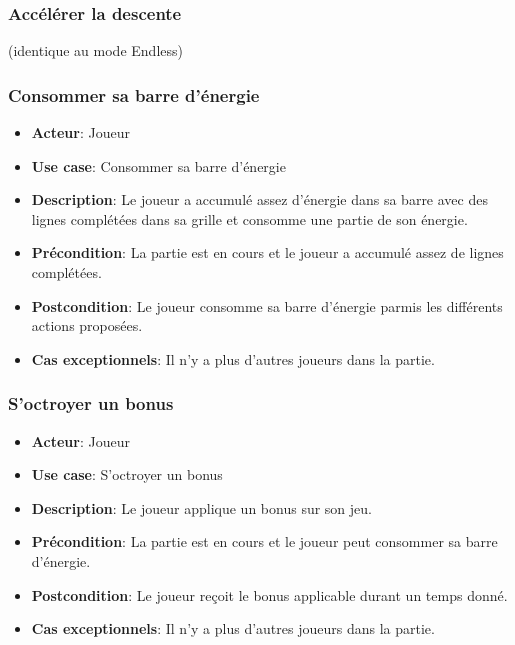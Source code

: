 \documentclass{article}
\begin{document}
\subsubsection*{Accélérer la descente} (identique au mode Endless)

\subsubsection*{Consommer sa barre d'énergie}
\begin{itemize}
    \item \textbf{Acteur}: Joueur
    \item \textbf{Use case}: Consommer sa barre d'énergie
    \item \textbf{Description}: Le joueur a accumulé assez d'énergie dans sa barre avec des lignes complétées dans sa grille et consomme une partie de son énergie.
    \item \textbf{Précondition}: La partie est en cours et le joueur a accumulé assez de lignes complétées.
    \item \textbf{Postcondition}: Le joueur consomme sa barre d'énergie parmis les différents actions proposées.
    \item \textbf{Cas exceptionnels}: Il n'y a plus d'autres joueurs dans la partie.
\end{itemize}

\subsubsection*{S'octroyer un bonus}
\begin{itemize}
    \item \textbf{Acteur}: Joueur
    \item \textbf{Use case}: S'octroyer un bonus
    \item \textbf{Description}: Le joueur applique un bonus sur son jeu.
    \item \textbf{Précondition}: La partie est en cours et le joueur peut consommer sa barre d'énergie.
    \item \textbf{Postcondition}: Le joueur reçoit le bonus applicable durant un temps donné. 
    \item \textbf{Cas exceptionnels}: Il n'y a plus d'autres joueurs dans la partie.
\end{itemize}
\end{document}

